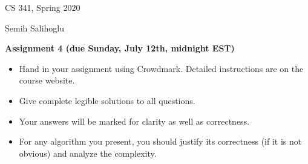 \documentclass[11pt]{article}
\begin{document}
\hfill CS 341, Spring 2020\par
\hfill Semih Salihoglu

\bigskip
\begin{center}\large\bf Assignment 4 (due Sunday, July 12th, midnight EST)
\end{center}

\begin{itemize}
\item Hand in your assignment using Crowdmark. Detailed instructions are on the course website.
\item Give complete legible solutions to all questions.
\item Your answers will be marked for clarity as well as correctness.
\item For any algorithm you present, you should justify its correctness
(if it is not obvious) and analyze the complexity.
\end{itemize}
\end{document}
